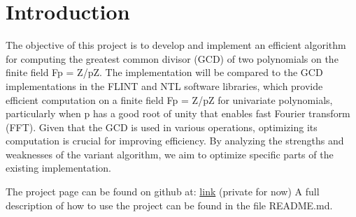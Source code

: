 \newpage
\section{Introduction}

The objective of this project is to develop and implement an efficient algorithm for computing the greatest common divisor (GCD) of two polynomials on the finite field Fp = Z/pZ. The implementation will be compared to the GCD implementations in the FLINT and NTL software libraries, which provide efficient computation on a finite field Fp = Z/pZ for univariate polynomials, particularly when p has a good root of unity that enables fast Fourier transform (FFT). Given that the GCD is used in various operations, optimizing its computation is crucial for improving efficiency. By analyzing the strengths and weaknesses of the variant algorithm, we aim to optimize specific parts of the existing implementation.

The project page can be found on github at:
\href{https://github.com/ElinaJnK/pgcd_polynomes}{link} (private for now)
\newline
A full description of how to use the project can be found in the file README.md.